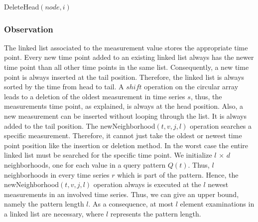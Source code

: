 \documentclass[abstracton,12pt]{scrreprt}
\begin{document}

\begin{algorithm}[H]
	\IncMargin{1em}
	\DontPrintSemicolon
	

	\caption{DeleteHead$(node, i)$}
		\label{deleteListValue}
\end{algorithm}

\subsubsection{Observation}
The linked list associated to the measurement value stores the appropriate time point. Every new time point added to an existing linked list always has the newer time point than all other time points in the same list. Consequently, a new time point is always inserted at the tail position. Therefore, the linked list is always sorted by the time from head to tail. A $shift$ operation on the circular array leads to a deletion of the oldest measurement in time series $s$, thus, the measurements time point, as explained, is always at the head position. Also, a new measurement can be inserted without looping through the list. It is always added to the tail position. The newNeighborhood$(t,v,j,l)$ operation searches a specific measurement. Therefore, it cannot just take the oldest or newest time point position like the insertion or deletion method. In the worst case the entire linked list must be searched for the specific time point. We initialize $l$ $\times$ $d$ neighborhoods, one for each value in a query pattern $Q(t)$. Thus, $l$ neighborhoods in every time series $r$ which is part of the pattern. Hence, the newNeighborhood$(t,v,j,l)$ operation always is executed at the $l$ newest measurements in an involved time series. Thus, we can give an upper bound, namely the pattern length $l$. As a consequence, at most $l$ element examinations in a linked list are necessary, where $l$ represents the pattern length.

\newpage
\end{document}
